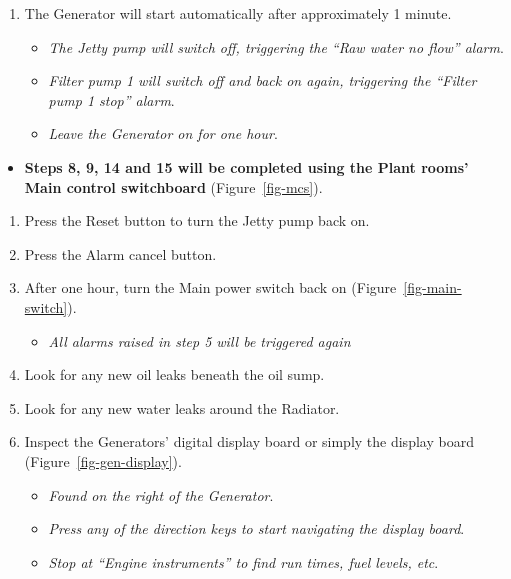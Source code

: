 \documentclass[
  12pt,
]{report}
\providecommand{\tightlist}{%
  \setlength{\itemsep}{0pt}\setlength{\parskip}{0pt}}\usepackage{longtable,booktabs,array}
\begin{document}
\begin{enumerate}
\def\labelenumi{\arabic{enumi}.}
\setcounter{enumi}{6}
\tightlist
\item
  The Generator will start automatically after approximately 1 minute.

  \begin{itemize}
  \tightlist
  \item
    \emph{The Jetty pump will switch off, triggering the ``Raw water no
    flow'' alarm}.
  \item
    \emph{Filter pump 1 will switch off and back on again, triggering
    the ``Filter pump 1 stop'' alarm}.
  \item
    \emph{Leave the Generator on for one hour}.
  \end{itemize}
\end{enumerate}

\begin{itemize}
\tightlist
\item
  \textbf{Steps 8, 9, 14 and 15 will be completed using the Plant rooms'
  Main control switchboard} (Figure~\ref{fig-mcs}).
\end{itemize}

\begin{enumerate}
\def\labelenumi{\arabic{enumi}.}
\setcounter{enumi}{7}
\tightlist
\item
  Press the Reset button to turn the Jetty pump back on.
\item
  Press the Alarm cancel button.
\item
  After one hour, turn the Main power switch back on
  (Figure~\ref{fig-main-switch}).

  \begin{itemize}
  \tightlist
  \item
    \emph{All alarms raised in step 5 will be triggered again}
  \end{itemize}
\item
  Look for any new oil leaks beneath the oil sump.
\item
  Look for any new water leaks around the Radiator.
\item
  Inspect the Generators' digital display board or simply the display
  board (Figure~\ref{fig-gen-display}).

  \begin{itemize}
  \tightlist
  \item
    \emph{Found on the right of the Generator}.
  \item
    \emph{Press any of the direction keys to start navigating the
    display board}.
  \item
    \emph{Stop at ``Engine instruments'' to find run times, fuel levels,
    etc}.
  \end{itemize}
\end{enumerate}
\end{document}
